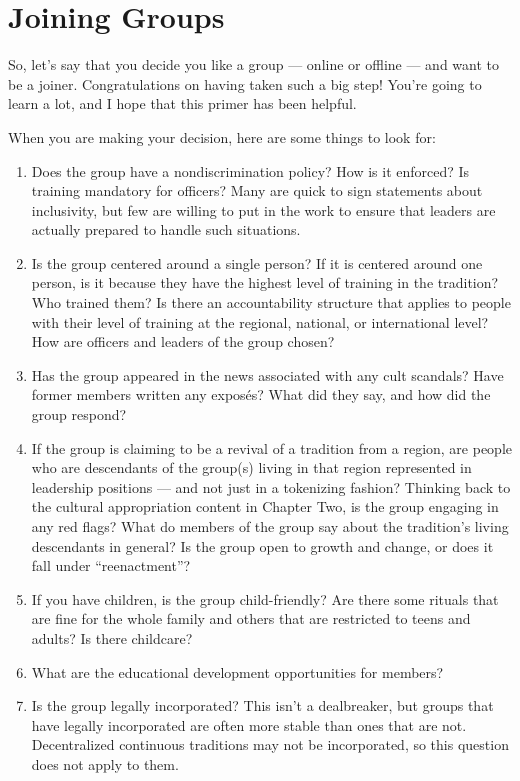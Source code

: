 \documentclass[
]{book}
\providecommand{\tightlist}{%
  \setlength{\itemsep}{0pt}\setlength{\parskip}{0pt}}
\begin{document}
\hypertarget{joining-groups}{%
\section{Joining Groups}\label{joining-groups}}

So, let's say that you decide you like a group --- online or offline --- and want to be a joiner. Congratulations on having taken such a big step! You're going to learn a lot, and I hope that this primer has been helpful.

When you are making your decision, here are some things to look for:

\begin{enumerate}
\def\labelenumi{\arabic{enumi}.}
\tightlist
\item
  Does the group have a nondiscrimination policy? How is it enforced? Is training mandatory for officers? Many are quick to sign statements about inclusivity, but few are willing to put in the work to ensure that leaders are actually prepared to handle such situations.
\item
  Is the group centered around a single person? If it is centered around one person, is it because they have the highest level of training in the tradition? Who trained them? Is there an accountability structure that applies to people with their level of training at the regional, national, or international level? How are officers and leaders of the group chosen?
\item
  Has the group appeared in the news associated with any cult scandals? Have former members written any exposés? What did they say, and how did the group respond?
\item
  If the group is claiming to be a revival of a tradition from a region, are people who are descendants of the group(s) living in that region represented in leadership positions --- and not just in a tokenizing fashion? Thinking back to the cultural appropriation content in Chapter Two, is the group engaging in any red flags? What do members of the group say about the tradition's living descendants in general? Is the group open to growth and change, or does it fall under ``reenactment''?
\item
  If you have children, is the group child-friendly? Are there some rituals that are fine for the whole family and others that are restricted to teens and adults? Is there childcare?
\item
  What are the educational development opportunities for members?
\item
  Is the group legally incorporated? This isn't a dealbreaker, but groups that have legally incorporated are often more stable than ones that are not. Decentralized continuous traditions may not be incorporated, so this question does not apply to them.
\end{enumerate}
\end{document}
